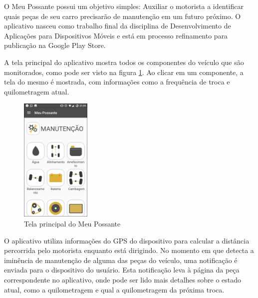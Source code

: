 O Meu Possante possui um objetivo simples: Auxiliar o motorista a identificar quais
peças de seu carro precisarão de manutenção em um futuro próximo. O aplicativo nasceu
como trabalho final da disciplina de Desenvolvimento de Aplicações para Dispositivos
Móveis e está em processo refinamento para publicação na Google Play Store.

A tela principal do aplicativo mostra todos os componentes do veículo que são monitorados,
como pode ser visto na figura \ref{meu-possante-tela-principal}. Ao clicar em um componente,
a tela do mesmo é mostrada, com informações como a frequência de troca e quilometragem
atual.

\begin{figure}[h]
\centering
\includegraphics[width=0.3\textwidth]{images/meu-possante-tela-principal.png}
\caption{Tela principal do Meu Possante}
\label{meu-possante-tela-principal}
\end{figure}

O aplicativo utiliza informações do GPS do dispositivo para calcular a distância percorrida
pelo motorista enquanto está dirigindo. No momento em que detecta a iminência de manutenção
de alguma das peças do veículo, uma notificação é enviada para o dispositivo do usuário.
Esta notificação leva à página da peça correspondente no aplicativo, onde pode ser lido
mais detalhes sobre o estado atual, como a quilometragem e qual a quilometragem da
próxima troca.%


